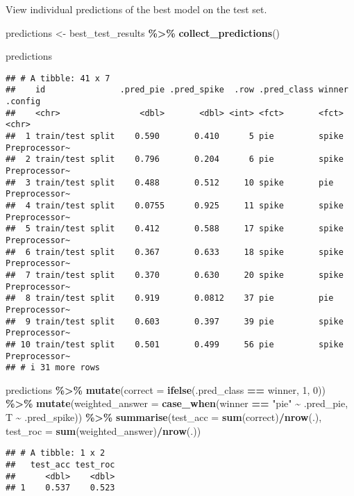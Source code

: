 \documentclass[
]{article}
\newenvironment{Shaded}{\begin{snugshade}}{\end{snugshade}}
\newcommand{\AttributeTok}[1]{\textcolor[rgb]{0.13,0.29,0.53}{#1}}
\newcommand{\DecValTok}[1]{\textcolor[rgb]{0.00,0.00,0.81}{#1}}
\newcommand{\FunctionTok}[1]{\textcolor[rgb]{0.13,0.29,0.53}{\textbf{#1}}}
\newcommand{\NormalTok}[1]{#1}
\newcommand{\OtherTok}[1]{\textcolor[rgb]{0.56,0.35,0.01}{#1}}
\newcommand{\SpecialCharTok}[1]{\textcolor[rgb]{0.81,0.36,0.00}{\textbf{#1}}}
\newcommand{\StringTok}[1]{\textcolor[rgb]{0.31,0.60,0.02}{#1}}
\begin{document}
View individual predictions of the best model on the test set.

\begin{Shaded}
\begin{Highlighting}[]
\NormalTok{predictions }\OtherTok{\textless{}{-}}\NormalTok{ best\_test\_results }\SpecialCharTok{\%\textgreater{}\%} 
  \FunctionTok{collect\_predictions}\NormalTok{() }

\NormalTok{predictions}
\end{Highlighting}
\end{Shaded}

\begin{verbatim}
## # A tibble: 41 x 7
##    id               .pred_pie .pred_spike  .row .pred_class winner .config      
##    <chr>                <dbl>       <dbl> <int> <fct>       <fct>  <chr>        
##  1 train/test split    0.590       0.410      5 pie         spike  Preprocessor~
##  2 train/test split    0.796       0.204      6 pie         spike  Preprocessor~
##  3 train/test split    0.488       0.512     10 spike       pie    Preprocessor~
##  4 train/test split    0.0755      0.925     11 spike       spike  Preprocessor~
##  5 train/test split    0.412       0.588     17 spike       spike  Preprocessor~
##  6 train/test split    0.367       0.633     18 spike       spike  Preprocessor~
##  7 train/test split    0.370       0.630     20 spike       spike  Preprocessor~
##  8 train/test split    0.919       0.0812    37 pie         pie    Preprocessor~
##  9 train/test split    0.603       0.397     39 pie         spike  Preprocessor~
## 10 train/test split    0.501       0.499     56 pie         spike  Preprocessor~
## # i 31 more rows
\end{verbatim}

\begin{Shaded}
\begin{Highlighting}[]
\NormalTok{predictions }\SpecialCharTok{\%\textgreater{}\%}
  \FunctionTok{mutate}\NormalTok{(}\AttributeTok{correct =} \FunctionTok{ifelse}\NormalTok{(.pred\_class }\SpecialCharTok{==}\NormalTok{ winner, }\DecValTok{1}\NormalTok{, }\DecValTok{0}\NormalTok{)) }\SpecialCharTok{\%\textgreater{}\%}
  \FunctionTok{mutate}\NormalTok{(}\AttributeTok{weighted\_answer =} \FunctionTok{case\_when}\NormalTok{(winner }\SpecialCharTok{==} \StringTok{"pie"} \SpecialCharTok{\textasciitilde{}}\NormalTok{ .pred\_pie,}
\NormalTok{                                     T }\SpecialCharTok{\textasciitilde{}}\NormalTok{ .pred\_spike)) }\SpecialCharTok{\%\textgreater{}\%}
  \FunctionTok{summarise}\NormalTok{(}\AttributeTok{test\_acc =} \FunctionTok{sum}\NormalTok{(correct)}\SpecialCharTok{/}\FunctionTok{nrow}\NormalTok{(.), }\AttributeTok{test\_roc =} \FunctionTok{sum}\NormalTok{(weighted\_answer)}\SpecialCharTok{/}\FunctionTok{nrow}\NormalTok{(.))}
\end{Highlighting}
\end{Shaded}

\begin{verbatim}
## # A tibble: 1 x 2
##   test_acc test_roc
##      <dbl>    <dbl>
## 1    0.537    0.523
\end{verbatim}
\end{document}
